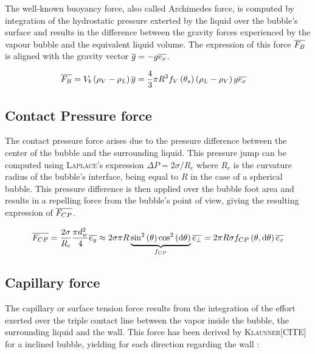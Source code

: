 The well-known buoyancy force, also called Archimedes force, is computed by integration of the hydrostatic pressure exterted by the liquid over the bubble's surface and results in the difference between the gravity forces experienced by the vapour bubble and the equivalent liquid volume. The expression of this force $\overline{F_{B}}$ is aligned with the gravity vector $\overline{g}=-g\overline{e_{x}}$.

\begin{align}
\overline{F_{B}}&=V_{b}\left( \rho_{V}-\rho_{L} \right)\overline{g}=\frac{4}{3}\pi R^{3}f_{V}\left( \theta_{s} \right)\left( \rho_{L}-\rho_{V} \right)g\overline{e_{x}}
\end{align}

\subsection{Contact Pressure force}

The contact pressure force arises due to the pressure difference between the center of the bubble and the surrounding liquid. This pressure jump can be computed using \textsc{Laplace}'s expression $\Delta P = 2\sigma / R_{c}$ where $R_{c}$ is the curvature radius of the bubble's interface, being equal to $R$ in the case of a spherical bubble. This pressure difference is then applied over the bubble foot area and results in a repelling force from the bubble's point of view, giving the resulting expression of $\overline{F_{CP}}$.

\begin{align}
\overline{F_{CP}}&=\frac{2\sigma}{R_{c}}\frac{\pi d_{w}^{2}}{4}\overline{e_{y}} \approx 2\sigma \pi R \underbrace{\mathrm{sin}^{2}\left( \theta \right) \mathrm{cos}^{2}\left( \mathrm{d}\theta \right)}_{f_{CP}}\overline{e_{\bot}} =2\pi R \sigma f_{CP}\left( \theta, \mathrm{d}\theta \right)\overline{e_{x}}\\
\end{align}

\subsection{Capillary force}

The capillary or surface tension force results from the integration of the effort exerted over the triple contact line between the vapor inside the bubble, the surrounding liquid and the wall. This force has been derived by \textsc{Klausner}[CITE] for a inclined bubble, yielding for each direction regarding the wall :

